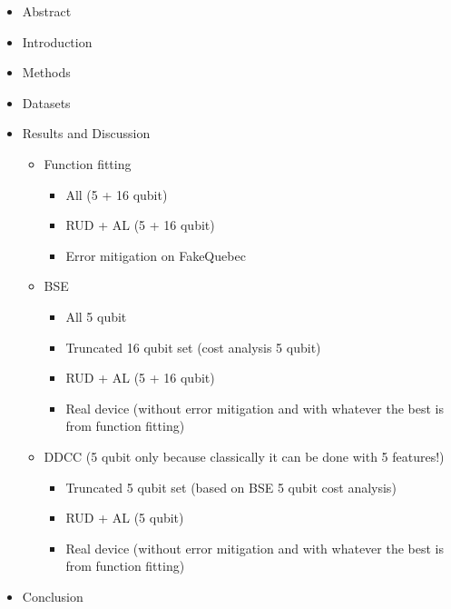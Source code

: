 \documentclass[journal=jacsat,manuscript=article]{achemso}
\begin{document}
\newpage
\begin{itemize}
	\item Abstract
	\item Introduction
	\item Methods
	\item Datasets
	\item Results and Discussion
	\begin{itemize}
		\item Function fitting 
		\begin{itemize}
			\item All (5 + 16 qubit)
			\item RUD + AL (5 + 16 qubit)
			\item Error mitigation on FakeQuebec
		\end{itemize}
		\item BSE
		\begin{itemize}
			\item All 5 qubit
			\item Truncated 16 qubit set (cost analysis 5 qubit)
			\item RUD + AL (5 + 16 qubit)
			\item Real device (without error mitigation and with whatever the best is from function fitting)
		\end{itemize}		
		\item DDCC (5 qubit only because classically it can be done with 5 features!)
		\begin{itemize}
			\item Truncated  5 qubit set (based on BSE 5 qubit cost analysis)
			\item RUD + AL (5 qubit)
			\item Real device (without error mitigation and with whatever the best is from function fitting)
		\end{itemize}				
	\end{itemize}
	\item Conclusion
\end{itemize}

\newpage
\end{document}
